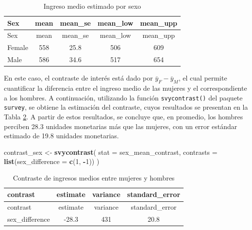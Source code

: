 \documentclass[
  spanish,
  12pt,
]{book}
\newenvironment{Shaded}{\begin{snugshade}}{\end{snugshade}}
\newcommand{\AttributeTok}[1]{\textcolor[rgb]{0.13,0.29,0.53}{#1}}
\newcommand{\DecValTok}[1]{\textcolor[rgb]{0.00,0.00,0.81}{#1}}
\newcommand{\FunctionTok}[1]{\textcolor[rgb]{0.13,0.29,0.53}{\textbf{#1}}}
\newcommand{\NormalTok}[1]{#1}
\newcommand{\OtherTok}[1]{\textcolor[rgb]{0.56,0.35,0.01}{#1}}
\newcommand{\SpecialCharTok}[1]{\textcolor[rgb]{0.81,0.36,0.00}{\textbf{#1}}}
\begin{document}
\begin{longtable}[]{@{}lcccc@{}}
\caption{\label{tab:tab-prom-sexo}Ingreso medio estimado por sexo}\tabularnewline
\toprule\noalign{}
Sex & mean & mean\_se & mean\_low & mean\_upp \\
\midrule\noalign{}
\endfirsthead
\toprule\noalign{}
Sex & mean & mean\_se & mean\_low & mean\_upp \\
\midrule\noalign{}
\endhead
\bottomrule\noalign{}
\endlastfoot
Female & 558 & 25.8 & 506 & 609 \\
Male & 586 & 34.6 & 517 & 654 \\
\end{longtable}

En este caso, el contraste de interés está dado por \(\bar{y}_{F} - \bar{y}_{M}\), el cual permite cuantificar la diferencia entre el ingreso medio de las mujeres y el correspondiente a los hombres. A continuación, utilizando la función \texttt{svycontrast()} del paquete \texttt{survey}, se obtiene la estimación del contraste, cuyos resultados se presentan en la Tabla \ref{tab:tab-contraste-sexo}. A partir de estos resultados, se concluye que, en promedio, los hombres perciben 28.3 unidades monetarias más que las mujeres, con un error estándar estimado de 19.8 unidades monetarias.

\begin{Shaded}
\begin{Highlighting}[]
\NormalTok{contrast\_sex }\OtherTok{\textless{}{-}} \FunctionTok{svycontrast}\NormalTok{(}
  \AttributeTok{stat =}\NormalTok{ sex\_mean\_contrast,}
  \AttributeTok{contrasts =} \FunctionTok{list}\NormalTok{(}\AttributeTok{sex\_difference =} \FunctionTok{c}\NormalTok{(}\DecValTok{1}\NormalTok{, }\SpecialCharTok{{-}}\DecValTok{1}\NormalTok{))}
\NormalTok{)}
\end{Highlighting}
\end{Shaded}

\begin{longtable}[]{@{}lccc@{}}
\caption{\label{tab:tab-contraste-sexo}Contraste de ingresos medios entre mujeres y hombres}\tabularnewline
\toprule\noalign{}
contrast & estimate & variance & standard\_error \\
\midrule\noalign{}
\endfirsthead
\toprule\noalign{}
contrast & estimate & variance & standard\_error \\
\midrule\noalign{}
\endhead
\bottomrule\noalign{}
\endlastfoot
sex\_difference & -28.3 & 431 & 20.8 \\
\end{longtable}
\end{document}
